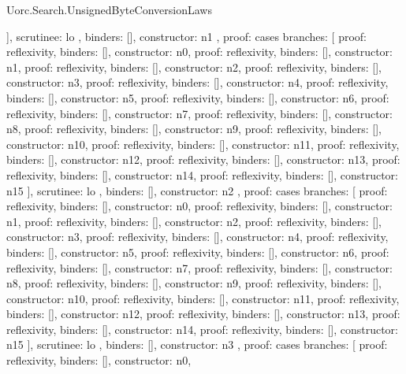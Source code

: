 \begin{lexlean}{Uorc.Search.UnsignedByteConversionLaws}
\begin{semanticmodule}
{{{{          ],
          scrutinee: lo
        },
        binders: [],
        constructor: n1
      },
      {
        proof: cases{
          branches: [
            {proof: reflexivity{}, binders: [], constructor: n0},
            {proof: reflexivity{}, binders: [], constructor: n1},
            {proof: reflexivity{}, binders: [], constructor: n2},
            {proof: reflexivity{}, binders: [], constructor: n3},
            {proof: reflexivity{}, binders: [], constructor: n4},
            {proof: reflexivity{}, binders: [], constructor: n5},
            {proof: reflexivity{}, binders: [], constructor: n6},
            {proof: reflexivity{}, binders: [], constructor: n7},
            {proof: reflexivity{}, binders: [], constructor: n8},
            {proof: reflexivity{}, binders: [], constructor: n9},
            {proof: reflexivity{}, binders: [], constructor: n10},
            {proof: reflexivity{}, binders: [], constructor: n11},
            {proof: reflexivity{}, binders: [], constructor: n12},
            {proof: reflexivity{}, binders: [], constructor: n13},
            {proof: reflexivity{}, binders: [], constructor: n14},
            {proof: reflexivity{}, binders: [], constructor: n15}
          ],
          scrutinee: lo
        },
        binders: [],
        constructor: n2
      },
      {
        proof: cases{
          branches: [
            {proof: reflexivity{}, binders: [], constructor: n0},
            {proof: reflexivity{}, binders: [], constructor: n1},
            {proof: reflexivity{}, binders: [], constructor: n2},
            {proof: reflexivity{}, binders: [], constructor: n3},
            {proof: reflexivity{}, binders: [], constructor: n4},
            {proof: reflexivity{}, binders: [], constructor: n5},
            {proof: reflexivity{}, binders: [], constructor: n6},
            {proof: reflexivity{}, binders: [], constructor: n7},
            {proof: reflexivity{}, binders: [], constructor: n8},
            {proof: reflexivity{}, binders: [], constructor: n9},
            {proof: reflexivity{}, binders: [], constructor: n10},
            {proof: reflexivity{}, binders: [], constructor: n11},
            {proof: reflexivity{}, binders: [], constructor: n12},
            {proof: reflexivity{}, binders: [], constructor: n13},
            {proof: reflexivity{}, binders: [], constructor: n14},
            {proof: reflexivity{}, binders: [], constructor: n15}
          ],
          scrutinee: lo
        },
        binders: [],
        constructor: n3
      },
      {
        proof: cases{
          branches: [
            {proof: reflexivity{}, binders: [], constructor: n0},
}}}}
\end{semanticmodule}
\end{lexlean}
